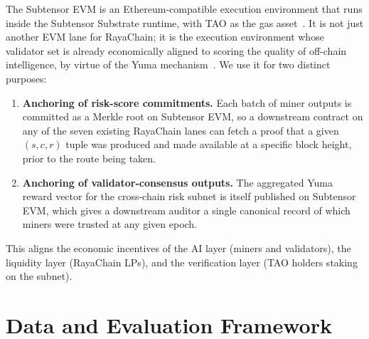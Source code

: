 \documentclass[11pt,a4paper]{article}
\begin{document}
The Subtensor EVM is an Ethereum-compatible execution environment that runs inside the
Subtensor Substrate runtime, with TAO as the gas asset~\cite{opentensor2024evm}. It is
not just another EVM lane for RayaChain; it is the execution environment whose
validator set is already economically aligned to scoring the quality of off-chain
intelligence, by virtue of the Yuma mechanism~\cite{opentensor2024yuma,
steeves2022incentivizing}. We use it for two distinct purposes:
\begin{enumerate}
  \item \textbf{Anchoring of risk-score commitments.} Each batch of miner outputs is
        committed as a Merkle root on Subtensor EVM, so a downstream contract on any
        of the seven existing RayaChain lanes can fetch a proof that a given
        $(s, c, r)$ tuple was produced and made available at a specific block height,
        prior to the route being taken.
  \item \textbf{Anchoring of validator-consensus outputs.} The aggregated Yuma reward
        vector for the cross-chain risk subnet is itself published on Subtensor EVM,
        which gives a downstream auditor a single canonical record of which miners
        were trusted at any given epoch.
\end{enumerate}
This aligns the economic incentives of the AI layer (miners and validators), the
liquidity layer (RayaChain LPs), and the verification layer (TAO holders staking on
the subnet).

\section{Data and Evaluation Framework}\label{sec:eval}
\end{document}
